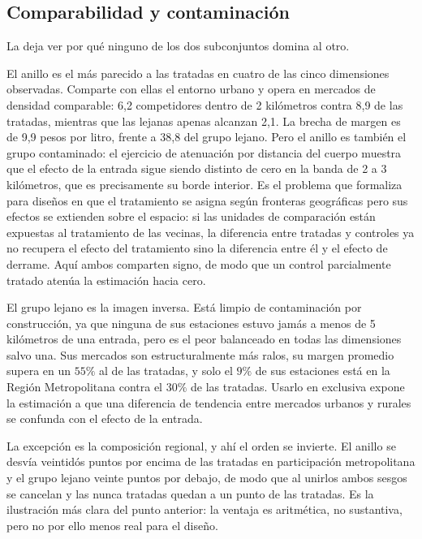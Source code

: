 \begin{table}[H]
\centering
\caption{Balance de covariables y tamaño de cada grupo de comparación}
\label{tab:balance}
\end{table}

\subsection{Comparabilidad y contaminación}

La  deja ver por qué ninguno de los dos subconjuntos domina al
otro.

El anillo es el más parecido a las tratadas en cuatro de las cinco dimensiones
observadas. Comparte con ellas el entorno urbano y opera en mercados de densidad
comparable: 6,2 competidores dentro de 2 kilómetros contra 8,9 de las tratadas,
mientras que las lejanas apenas alcanzan 2,1. La brecha de margen es de 9,9
pesos por litro, frente a 38,8 del grupo lejano. Pero el anillo es también el
grupo contaminado: el ejercicio de atenuación por distancia del cuerpo muestra
que el efecto de la entrada sigue siendo distinto de cero en la banda de 2 a 3
kilómetros, que es precisamente su borde interior. Es el problema que
\textcite{BUTTS2023} formaliza para diseños en que el tratamiento se asigna
según fronteras geográficas pero sus efectos se extienden sobre el espacio: si
las unidades de comparación están expuestas al tratamiento de las vecinas, la
diferencia entre tratadas y controles ya no recupera el efecto del tratamiento
sino la diferencia entre él y el efecto de derrame. Aquí ambos comparten signo,
de modo que un control parcialmente tratado atenúa la estimación hacia cero.

El grupo lejano es la imagen inversa. Está limpio de contaminación por
construcción, ya que ninguna de sus estaciones estuvo jamás a menos de 5
kilómetros de una entrada, pero es el peor balanceado en todas las dimensiones
salvo una. Sus mercados son estructuralmente más ralos, su margen promedio
supera en un $55\%$ al de las tratadas, y solo el $9\%$ de sus estaciones está
en la Región Metropolitana contra el $30\%$ de las tratadas. Usarlo en exclusiva
expone la estimación a que una diferencia de tendencia entre mercados urbanos y
rurales se confunda con el efecto de la entrada.

La excepción es la composición regional, y ahí el orden se invierte. El anillo se
desvía veintidós puntos por encima de las tratadas en participación
metropolitana y el grupo lejano veinte puntos por debajo, de modo que al unirlos
ambos sesgos se cancelan y las nunca tratadas quedan a un punto de las tratadas.
Es la ilustración más clara del punto anterior: la ventaja es aritmética, no
sustantiva, pero no por ello menos real para el diseño.

